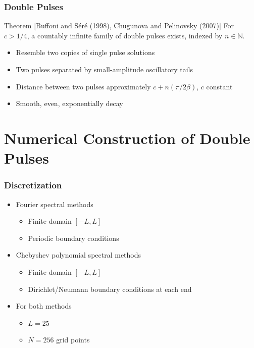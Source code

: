 \documentclass[16pt]{beamer}
\begin{document}
\begin{frame}
	\frametitle{Double Pulses}
	\fontsize{16}{7.2}\selectfont

	\begin{block}{Theorem \footnotesize [Buffoni and S\'er\'e (1998), Chugunova and Pelinovsky (2007)]}
	For $c>1/4$, a countably infinite family of double pulses exists, indexed by $n \in \mathbb{N}$.
	\begin{itemize}
		\item Resemble two copies of single pulse solutions
		\item Two pulses separated by small-amplitude oscillatory tails
		\item Distance between two pulses approximately $c + n (\pi / 2 \beta)$, $c$ constant
		\item Smooth, even, exponentially decay
	\end{itemize}
	\end{block}

\end{frame}

\section{Numerical Construction of Double Pulses}

\begin{frame}
	\frametitle{Discretization}
	\fontsize{16}{7.2}\selectfont
	\begin{itemize} 
		\item Fourier spectral methods
		\begin{itemize} 
			\item Finite domain $[-L, L]$
			\item Periodic boundary conditions
		\end{itemize}
		\item Chebyshev polynomial spectral methods
		\begin{itemize} 
			\item Finite domain $[-L, L]$
			\item Dirichlet/Neumann boundary conditions at each end
		\end{itemize}
		\item For both methods
		\begin{itemize} 
			\item $L = 25$ 
			\item $N = 256$ grid points
		\end{itemize}
	\end{itemize}
\end{frame}
\end{document}
